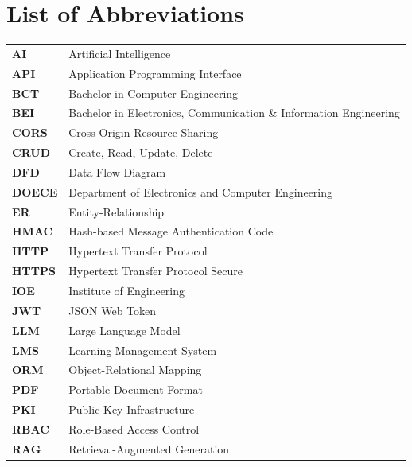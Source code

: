 \documentclass[12pt]{report}
\begin{document}
\tableofcontents
\listoffigures
{}
\listoftables
{}

\chapter*{List of Abbreviations}
\begin{tabular}{p{2.5cm} l}
\textbf{AI}       & Artificial Intelligence\\
\textbf{API}      & Application Programming Interface\\
\textbf{BCT}      & Bachelor in Computer Engineering\\
\textbf{BEI}      & Bachelor in Electronics, Communication \& Information Engineering\\
\textbf{CORS}     & Cross-Origin Resource Sharing\\
\textbf{CRUD}     & Create, Read, Update, Delete\\
\textbf{DFD}      & Data Flow Diagram\\
\textbf{DOECE}    & Department of Electronics and Computer Engineering\\
\textbf{ER}       & Entity-Relationship\\
\textbf{HMAC}     & Hash-based Message Authentication Code\\
\textbf{HTTP}     & Hypertext Transfer Protocol\\
\textbf{HTTPS}    & Hypertext Transfer Protocol Secure\\
\textbf{IOE}      & Institute of Engineering\\
\textbf{JWT}      & JSON Web Token\\
\textbf{LLM}      & Large Language Model\\
\textbf{LMS}      & Learning Management System\\
\textbf{ORM}      & Object-Relational Mapping\\
\textbf{PDF}      & Portable Document Format\\
\textbf{PKI}      & Public Key Infrastructure\\
\textbf{RBAC}     & Role-Based Access Control\\
\textbf{RAG}      & Retrieval-Augmented Generation\\

\end{tabular}
\end{document}
